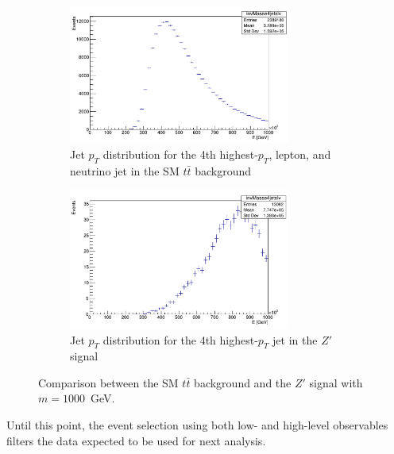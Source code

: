 \begin{figure}[H]
    \begin{subfigure}[b]{0.48\textwidth}
        \centering
        \includegraphics[width=0.8\textwidth]{Figure/high_4jet_tt.png}
        \caption{Jet \(p_T\) distribution for the 4th highest-\(p_T\), lepton, and neutrino jet in the SM \(t\bar{t}\) background}
        \label{fig:plot_high_c}
    \end{subfigure}
    \hfill
    \begin{subfigure}[b]{0.48\textwidth}
        \centering
        \includegraphics[width=0.8\textwidth]{Figure/high_4jet_zz.png}
        \caption{Jet \(p_T\) distribution for the 4th highest-\(p_T\) jet in the \(Z'\) signal}
        \label{fig:plot_high_d}
    \end{subfigure}

    \caption{Comparison between the SM \(t\bar{t}\) background and the \(Z'\) signal with \(m = 1000\)~GeV.}
    \label{fig:plot_high}
\end{figure}
Until this point, the event selection using both low- and high-level observables filters the data expected to be used for next analysis.






